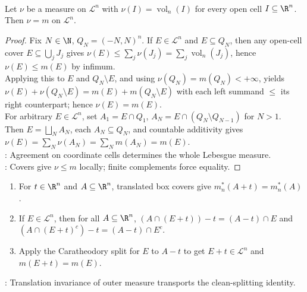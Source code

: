 \begin{theorem} \label{thm:lebesgue-measure-unique-on-open-cells} \\
Let $\nu$ be a measure on $\mathcal{L}^n$ with $\nu(I)=\operatorname{vol}_n(I)$ for every open cell $I\subseteq\R^n$. Then $\nu=m$ on $\mathcal{L}^n$.
\begin{proof}
Fix $N\in\N$, $Q_N=(-N,N)^n$. If $E\in\mathcal{L}^n$ and $E\subseteq Q_N$, then any open-cell cover $E\subseteq\bigcup_jJ_j$ gives $\nu(E)\leq\sum_j\nu(J_j)=\sum_j\operatorname{vol}_n(J_j)$, hence $\nu(E)\leq m(E)$ by infimum.\\
Applying this to $E$ and $Q_N\setminus E$, and using $\nu(Q_N)=m(Q_N)<+\infty$, yields $\nu(E)+\nu(Q_N\setminus E)=m(E)+m(Q_N\setminus E)$ with each left summand $\leq$ its right counterpart; hence $\nu(E)=m(E)$.\\
For arbitrary $E\in\mathcal{L}^n$, set $A_1=E\cap Q_1$, $A_N=E\cap(Q_N\setminus Q_{N-1})$ for $N>1$.\\
Then $E=\bigsqcup_NA_N$, each $A_N\subseteq Q_N$, and countable additivity gives $\nu(E)=\sum_N\nu(A_N)=\sum_Nm(A_N)=m(E)$.\\
: Agreement on coordinate cells determines the whole Lebesgue measure.\\
: Covers give $\nu\leq m$ locally; finite complements force equality.
\end{proof}
\end{theorem}

\begin{method} \label{meth:translation-invariance-caratheodory} 
\begin{enumerate}[label=(\roman*)]
\setlength{\itemsep}{0pt}
\item For $t\in\R^n$ and $A\subseteq\R^n$, translated box covers give $m_n^\ast(A+t)=m_n^\ast(A)$.
\item If $E\in\mathcal{L}^n$, then for all $A\subseteq\R^n$, $(A\cap(E+t))-t=(A-t)\cap E$ and $(A\cap(E+t)^c)-t=(A-t)\cap E^c$.
\item Apply the Caratheodory split for $E$ to $A-t$ to get $E+t\in\mathcal{L}^n$ and $m(E+t)=m(E)$.
\end{enumerate}
: Translation invariance of outer measure transports the clean-splitting identity.
\end{method}

